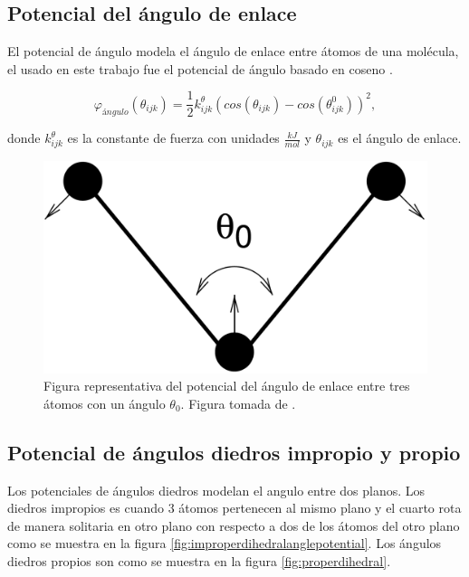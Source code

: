 \subsection{Potencial del ángulo de enlace}

El potencial de ángulo modela el ángulo de enlace entre átomos de una molécula, el usado en este trabajo fue el potencial de ángulo basado en coseno \cite{gromacsdoc}.

\begin{equation}
    \varphi_{ángulo}(\theta_{ijk}) = \frac{1}{2}k^{\theta}_{ijk}\left(cos(\theta_{ijk}) - cos(\theta^{0}_{ijk})\right)^2,
\end{equation}

\noindent donde $k^{\theta}_{ijk}$ es la constante de fuerza con unidades $\frac{kJ}{mol}$ y $\theta_{ijk}$ es el ángulo de enlace.\\

\begin{figure}[!h]
    \centering
    \includegraphics[width=.4\linewidth]{MD/anglepotential.png}  
    \caption{Figura representativa del potencial del ángulo de enlace entre tres átomos con un ángulo $\theta_0$. Figura tomada de \cite{gromacsdoc}.}
    \label{fig:anglepotential}
\end{figure}

\subsection{Potencial de ángulos diedros impropio y propio}

Los potenciales de ángulos diedros modelan el angulo entre dos planos. Los diedros impropios es cuando 3 átomos pertenecen al mismo plano y el cuarto rota de manera solitaria en otro plano con respecto a dos de los átomos del otro plano como se muestra en la figura \ref{fig:improperdihedralanglepotential}. Los ángulos diedros propios son como se muestra en la figura \ref{fig:properdihedral}.

